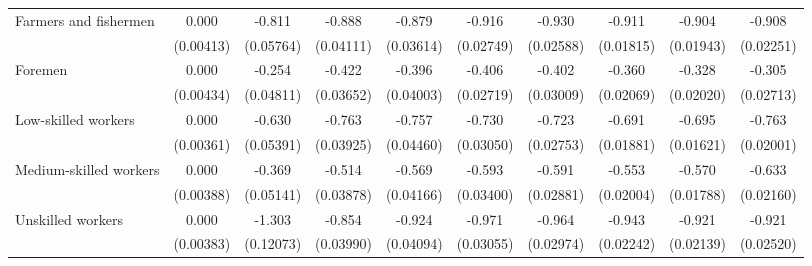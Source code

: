 {\begin{tabular}{l*{9}{c}}
Farmers and fishermen&       0.000         &      -0.811\sym{***}&      -0.888\sym{***}&      -0.879\sym{***}&      -0.916\sym{***}&      -0.930\sym{***}&      -0.911\sym{***}&      -0.904\sym{***}&      -0.908\sym{***}\\
                    &   (0.00413)         &   (0.05764)         &   (0.04111)         &   (0.03614)         &   (0.02749)         &   (0.02588)         &   (0.01815)         &   (0.01943)         &   (0.02251)         \\
Foremen             &       0.000         &      -0.254\sym{***}&      -0.422\sym{***}&      -0.396\sym{***}&      -0.406\sym{***}&      -0.402\sym{***}&      -0.360\sym{***}&      -0.328\sym{***}&      -0.305\sym{***}\\
                    &   (0.00434)         &   (0.04811)         &   (0.03652)         &   (0.04003)         &   (0.02719)         &   (0.03009)         &   (0.02069)         &   (0.02020)         &   (0.02713)         \\
Low-skilled workers &       0.000         &      -0.630\sym{***}&      -0.763\sym{***}&      -0.757\sym{***}&      -0.730\sym{***}&      -0.723\sym{***}&      -0.691\sym{***}&      -0.695\sym{***}&      -0.763\sym{***}\\
                    &   (0.00361)         &   (0.05391)         &   (0.03925)         &   (0.04460)         &   (0.03050)         &   (0.02753)         &   (0.01881)         &   (0.01621)         &   (0.02001)         \\
Medium-skilled workers&       0.000         &      -0.369\sym{***}&      -0.514\sym{***}&      -0.569\sym{***}&      -0.593\sym{***}&      -0.591\sym{***}&      -0.553\sym{***}&      -0.570\sym{***}&      -0.633\sym{***}\\
                    &   (0.00388)         &   (0.05141)         &   (0.03878)         &   (0.04166)         &   (0.03400)         &   (0.02881)         &   (0.02004)         &   (0.01788)         &   (0.02160)         \\
Unskilled workers   &       0.000         &      -1.303\sym{***}&      -0.854\sym{***}&      -0.924\sym{***}&      -0.971\sym{***}&      -0.964\sym{***}&      -0.943\sym{***}&      -0.921\sym{***}&      -0.921\sym{***}\\
                    &   (0.00383)         &   (0.12073)         &   (0.03990)         &   (0.04094)         &   (0.03055)         &   (0.02974)         &   (0.02242)         &   (0.02139)         &   (0.02520)         \\

\end{tabular}}
